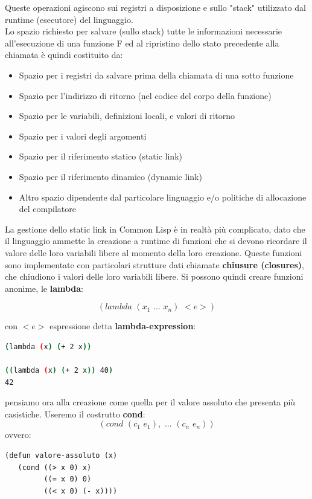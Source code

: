 \documentclass[a4paper,12pt, oneside]{book}
\begin{document}
Queste operazioni agiscono sui registri a disposizione e sullo "stack" utilizzato dal runtime (esecutore) del linguaggio.\\Lo spazio richiesto per salvare (sullo stack) tutte le informazioni necessarie all'esecuzione di
una funzione F ed al ripristino dello stato precedente alla chiamata è quindi costituito da:
\begin{itemize}
	\item Spazio per i registri da salvare prima della chiamata di una sotto funzione
	\item Spazio per l'indirizzo di ritorno (nel codice del corpo della funzione)
	\item Spazio per le variabili, definizioni locali, e valori di ritorno
	\item Spazio per i valori degli argomenti
	\item Spazio per il riferimento statico (static link)
	\item Spazio per il riferimento dinamico (dynamic link)
	\item Altro spazio dipendente dal particolare linguaggio e/o politiche di allocazione del compilatore
\end{itemize}
La gestione dello static link in Common Lisp è in realtà più complicato,
dato che il linguaggio ammette la creazione a runtime di funzioni che si
devono ricordare il valore delle loro variabili libere al momento della
loro creazione. Queste funzioni sono implementate con particolari strutture dati chiamate \textbf{chiusure (closures)}, che chiudiono i valori delle loro variabili libere. Si possono quindi creare funzioni anonime, le \textbf{lambda}:
\begin{center}
	$$(lambda\,\,(x_1\,\,...\,\,x_n)\,\,<e>)$$
\end{center}
con $<e>$ espressione detta \textbf{lambda-expression}:
\begin{shaded}
	\begin{lstlisting}[language=bash]
(lambda (x) (+ 2 x))

((lambda (x) (+ 2 x)) 40)
42
\end{lstlisting}
\end{shaded}
pensiamo ora alla creazione come quella per il valore assoluto che presenta più casistiche. Useremo il costrutto \textbf{cond}:
$$(cond\,\,(c_1\,\,e_1),\,\,...\,\,(c_n\,\,e_n))$$
ovvero:
\begin{verbatim}
(defun valore-assoluto (x)
   (cond ((> x 0) x)
         ((= x 0) 0)
         ((< x 0) (- x))))
\end{verbatim}
\end{document}
